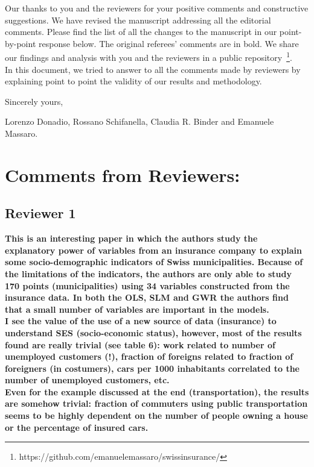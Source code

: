 \documentclass[12pt]{article}
\begin{document}
Our thanks to you and the reviewers for your positive comments and constructive suggestions. We have revised the manuscript addressing all the editorial comments. Please find the list of all the changes to the manuscript in our point-by-point response below. The original referees’ comments are in bold. We share our findings and analysis with you and the reviewers in a public repository~\footnote{https://github.com/emanuelemassaro/swissinsurance/}.\\

In this document, we tried to answer to all the comments made by reviewers by explaining point to point the validity of our results and methodology.

Sincerely yours,

Lorenzo Donadio, Rossano Schifanella, Claudia R. Binder and Emanuele Massaro.



\section*{Comments from Reviewers:}

\subsection*{Reviewer 1}

\textbf{This is an interesting paper in which the authors study the explanatory power of variables from an insurance company to explain some socio-demographic indicators of Swiss municipalities. Because of the limitations of the indicators, the authors are only able to study 170 points (municipalities) using 34 variables constructed from the insurance data. In both the OLS, SLM and GWR the authors find that a small number of variables are important in the models.\\I see the value of the use of a new source of data (insurance) to understand SES (socio-economic status), however, most of the results found are really trivial (see table 6): work related to number of unemployed customers (!), fraction of foreigns related to fraction of foreigners (in costumers), cars per 1000 inhabitants correlated to the number of unemployed customers, etc.\\Even for the example discussed at the end (transportation), the results are somehow trivial: fraction of commuters using public transportation seems to be highly dependent on the number of people owning a house or the percentage of insured cars.}
\end{document}
